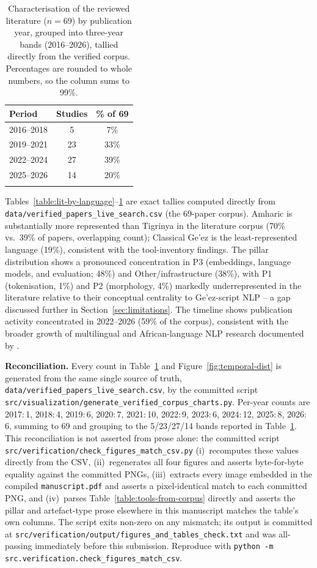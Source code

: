 \documentclass[sn-mathphys-num]{sn-jnl}
\theoremstyle{thmstyleone}
\theoremstyle{thmstyletwo}
\theoremstyle{thmstylethree}
\begin{document}
\begin{table}[h]
\caption{Characterisation of the reviewed literature ($n=69$) by publication year, grouped into three-year bands (2016--2026), tallied directly from the verified corpus. Percentages are rounded to whole numbers, so the column sums to 99\%.}\label{table:lit-by-year}
\begin{tabular}{@{}lcc@{}}
\toprule
\textbf{Period} & \textbf{Studies} & \textbf{\% of 69} \\
\midrule
2016--2018 & 5 & 7\% \\
2019--2021 & 23 & 33\% \\
2022--2024 & 27 & 39\% \\
2025--2026 & 14 & 20\% \\
\botrule
\end{tabular}
\end{table}

\noindent Tables~\ref{table:lit-by-language}--\ref{table:lit-by-year} are exact tallies computed directly from \texttt{data/verified\_papers\_live\_search.csv} (the 69-paper corpus). Amharic is substantially more represented than Tigrinya in the literature corpus (70\% vs.\ 39\% of papers, overlapping count); Classical Ge'ez is the least-represented language (19\%), consistent with the tool-inventory findings. The pillar distribution shows a pronounced concentration in P3 (embeddings, language models, and evaluation; 48\%) and Other/infrastructure (38\%), with P1 (tokenisation, 1\%) and P2 (morphology, 4\%) markedly underrepresented in the literature relative to their conceptual centrality to Ge'ez-script NLP -- a gap discussed further in Section~\ref{sec:limitations}. The timeline shows publication activity concentrated in 2022--2026 (59\% of the corpus), consistent with the broader growth of multilingual and African-language NLP research documented by \citet{joshi_state_2020}.

\textbf{Reconciliation.} Every count in Table~\ref{table:lit-by-year} and Figure~\ref{fig:temporal-dist} is generated from the same single source of truth, \texttt{data/verified\_papers\_live\_search.csv}, by the committed script \texttt{src/visualization/generate\_verified\_corpus\_charts.py}. Per-year counts are 2017:\,1, 2018:\,4, 2019:\,6, 2020:\,7, 2021:\,10, 2022:\,9, 2023:\,6, 2024:\,12, 2025:\,8, 2026:\,6, summing to 69 and grouping to the 5/23/27/14 bands reported in Table~\ref{table:lit-by-year}. This reconciliation is not asserted from prose alone: the committed script \texttt{src/verification/check\_figures\_match\_csv.py} (i)~recomputes these values directly from the CSV, (ii)~regenerates all four figures and asserts byte-for-byte equality against the committed PNGs, (iii)~extracts every image embedded in the compiled \texttt{manuscript.pdf} and asserts a pixel-identical match to each committed PNG, and (iv)~parses Table~\ref{table:tools-from-corpus} directly and asserts the pillar and artefact-type prose elsewhere in this manuscript matches the table's own columns. The script exits non-zero on any mismatch; its output is committed at \texttt{src/verification/output/figures\_and\_tables\_check.txt} and was all-passing immediately before this submission. Reproduce with \texttt{python -m src.verification.check\_figures\_match\_csv}.
\end{document}
